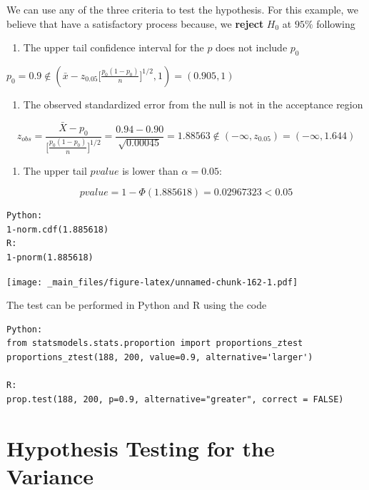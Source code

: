 \documentclass[
]{book}
\providecommand{\tightlist}{%
  \setlength{\itemsep}{0pt}\setlength{\parskip}{0pt}}
\begin{document}
We can use any of the three criteria to test the hypothesis. For this example, we believe that have a satisfactory process because, we \textbf{reject} \(H_0\) at \(95\%\) following

\begin{enumerate}
\def\labelenumi{\arabic{enumi}.}
\tightlist
\item
  The upper tail confidence interval for the \(p\) does not include \(p_0\)
\end{enumerate}

\(p_0=0.9 \notin (\bar{x}-z_{0.05}\big[\frac{p_0(1-p_0)}{n} \big]^{1/2},1)= (0.905,1)\)

\begin{enumerate}
\def\labelenumi{\arabic{enumi}.}
\setcounter{enumi}{1}
\tightlist
\item
  The observed standardized error from the null is not in the acceptance region
\end{enumerate}

\[z_{obs}= \frac{\bar{X}-p_0}{\big[\frac{p_0(1-p_0)}{n} \big]^{1/2}} =\frac{0.94-0.90}{\sqrt{0.00045}}=1.88563 \notin (-\infty, z_{0.05})=(-\infty, 1.644)\]

\begin{enumerate}
\def\labelenumi{\arabic{enumi}.}
\setcounter{enumi}{2}
\tightlist
\item
  The upper tail \(pvalue\) is lower than \(\alpha=0.05\):
\end{enumerate}

\[pvalue=1-\Phi(1.885618)=0.02967323<0.05\]

\begin{verbatim}
Python: 
1-norm.cdf(1.885618)
R:
1-pnorm(1.885618)
\end{verbatim}

\texttt{[image: \_main\_files/figure-latex/unnamed-chunk-162-1.pdf]}

The test can be performed in Python and R using the code

\begin{verbatim}
Python:
from statsmodels.stats.proportion import proportions_ztest
proportions_ztest(188, 200, value=0.9, alternative='larger')

R:
prop.test(188, 200, p=0.9, alternative="greater", correct = FALSE)
\end{verbatim}

\hypertarget{hypothesis-testing-for-the-variance}{%
\section{Hypothesis Testing for the Variance}\label{hypothesis-testing-for-the-variance}}
\end{document}

